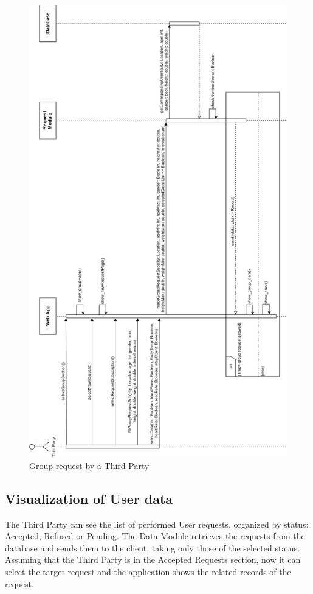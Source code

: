 \begin{figure}[H]

    \centering
    \includegraphics[scale=0.2]{./Pictures/groupRequestSeqDiagDDV.png}
    \caption{Group request by a Third Party}
    
\end{figure}

\subsection{Visualization of User data}
The Third Party can see the list of performed User requests, organized by status: Accepted, Refused or Pending. The Data Module retrieves the requests from the database and sends them to the client, taking only those of the selected status. Assuming that the Third Party is in the Accepted Requests section, now it can select the target request and the application shows the related records of the request.

